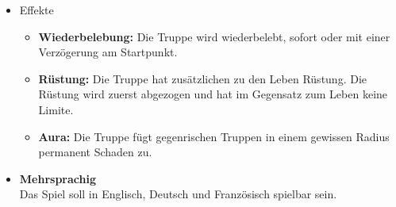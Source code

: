 \begin{itemize}
    \item Effekte
    \begin{itemize}
        \item \textbf{Wiederbelebung:}
            Die Truppe wird wiederbelebt, sofort oder mit einer Verzögerung am Startpunkt.
        \item \textbf{Rüstung:}
            Die Truppe hat zusätzlichen zu den Leben Rüstung. Die Rüstung wird zuerst abgezogen und hat im Gegensatz zum Leben keine Limite.
        \item \textbf{Aura:}
            Die Truppe fügt gegenrischen Truppen in einem gewissen Radius permanent Schaden zu.
    \end{itemize}
    \item \textbf{Mehrsprachig} \\
        Das Spiel soll in Englisch, Deutsch und Französisch spielbar sein.
\end{itemize}

